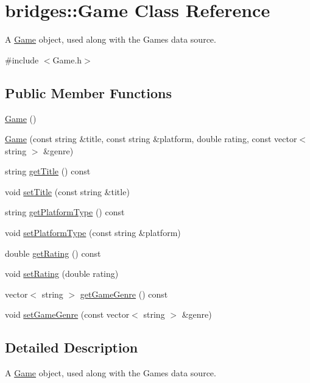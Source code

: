 \hypertarget{classbridges_1_1_game}{}\section{bridges\+:\+:Game Class Reference}
\label{classbridges_1_1_game}


A \hyperlink{classbridges_1_1_game}{Game} object, used along with the Games data source.  




{\ttfamily \#include $<$Game.\+h$>$}

\subsection*{Public Member Functions}
\begin{DoxyCompactItemize}
\item 
\hyperlink{classbridges_1_1_game_a44f625a03ebf144931aa9e7e5440303c}{Game} ()
\item 
\hyperlink{classbridges_1_1_game_a2cc784203a2e9ab69141eb45714cb5db}{Game} (const string \&title, const string \&platform, double rating, const vector$<$ string $>$ \&genre)
\item 
string \hyperlink{classbridges_1_1_game_a49e334cab245cbc5460806bfed18b279}{get\+Title} () const 
\item 
void \hyperlink{classbridges_1_1_game_af5c88115cd037f6d5853fdf1ff79f3a3}{set\+Title} (const string \&title)
\item 
string \hyperlink{classbridges_1_1_game_a1fa96763c44813f3a0b5a24db3df4d94}{get\+Platform\+Type} () const 
\item 
void \hyperlink{classbridges_1_1_game_aa31882c5e10583faee89379c0e8b9056}{set\+Platform\+Type} (const string \&platform)
\item 
double \hyperlink{classbridges_1_1_game_ac6c8dfe00d817c860566dd92984adf82}{get\+Rating} () const 
\item 
void \hyperlink{classbridges_1_1_game_a0b9b3180975b2d3028b9090559bb6624}{set\+Rating} (double rating)
\item 
vector$<$ string $>$ \hyperlink{classbridges_1_1_game_abe17f8063757d73be3d5b1a91c262c80}{get\+Game\+Genre} () const 
\item 
void \hyperlink{classbridges_1_1_game_a3096d8ceea27035800b246e59bcb520a}{set\+Game\+Genre} (const vector$<$ string $>$ \&genre)
\end{DoxyCompactItemize}


\subsection{Detailed Description}
A \hyperlink{classbridges_1_1_game}{Game} object, used along with the Games data source. 

